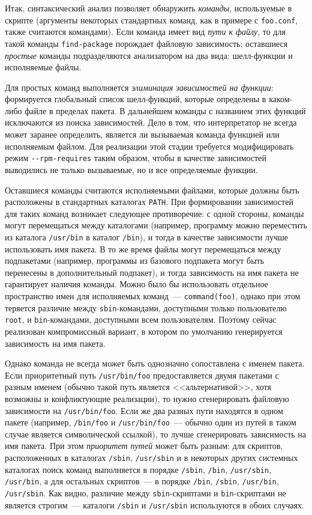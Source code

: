 \documentclass[russian,a4paper,12pt,titlepage]{article}
\begin{document}
Итак, синтаксический анализ позволяет обнаружить \textit{команды}, используемые в скрипте (аргументы некоторых стандартных команд,
как в примере с \verb|foo.conf|, также считаются командами).  Если команда имеет вид \textit{пути к файлу}, то для такой команды
\verb|find-package| порождает файловую зависимость; оставшиеся \textit{простые} команды подразделяются анализатором
на два вида: шелл-функции и исполняемые файлы.

Для простых команд выполняется \textit{элиминация зависимостей на функции}: формируется глобальный список шелл-функций,
которые определены в каком-либо файле в пределах пакета.  В дальнейшем команды с названием этих функций исключаются
из поиска зависимостей.  Дело в том, что интерпретатор не всегда может заранее определить, является ли вызываемая
команда функцией или исполняемым файлом.  Для реализации этой стадии требуется модифицировать режим \verb|--rpm-requires|
таким образом, чтобы в качестве зависимостей выводились не только вызываемые, но и все определяемые функции.

Оставшиеся команды считаются исполняемыми файлами, которые должны быть расположены в стандартных каталогах \verb|PATH|.
При формировании зависимостей для таких команд возникает следующее противоречие: с одной стороны, команды могут
перемещаться между каталогами (например, программу можно переместить из каталога \verb|/usr/bin| в каталог \verb|/bin|),
и тогда в качестве зависимости лучше использовать имя пакета.  В то же время файлы могут перемещаться между
подпакетами (например, программы из базового подпакета могут быть перенесены в дополнительный подпакет), и тогда
зависимость на имя пакета не гарантирует наличия команды.  Можно было бы использовать отдельное пространство имен
для исполняемых команд~--- \verb|command(foo)|, однако при этом теряется различие между \verb|sbin|-командами,
доступными только пользователю \verb|root|, и \verb|bin|-командами, доступными всем пользователям.  Поэтому
сейчас реализован компромиссный вариант, в котором по умолчанию генерируется зависимость на имя пакета.

Однако команда не всегда может быть однозначно сопоставлена с именем пакета.  Если приоритетный путь \verb|/usr/bin/foo|
предоставляется двумя пакетами с разным именем (обычно такой путь является <<альтернативой>>, хотя возможны и конфликтующие
реализации), то нужно сгенерировать файловую зависимости на \verb|/usr/bin/foo|.  Если же два разных пути находятся
в одном пакете (например, \verb|/bin/foo| и \verb|/usr/bin/foo|~--- обычно один из путей в таком случае является символической
ссылкой), то лучше сгенерировать зависимость на имя пакета.  При этом \textit{приоритет путей} может быть разным: для скриптов,
расположенных в каталогах \verb|/sbin|, \verb|/usr/sbin| и в некоторых других системных каталогах поиск команд выполняется
в порядке
\verb|/sbin|, \verb|/bin|, \verb|/usr/sbin|, \verb|/usr/bin|,
а для остальных скриптов~--- в порядке
\verb|/bin|, \verb|/sbin|, \verb|/usr/bin|, \verb|/usr/sbin|.
Как видно, различие между \verb|sbin|-скриптами и \verb|bin|-скриптами не является строгим~---
каталоги \verb|/sbin| и \verb|/usr/sbin| используются в обоих случаях.
\end{document}
